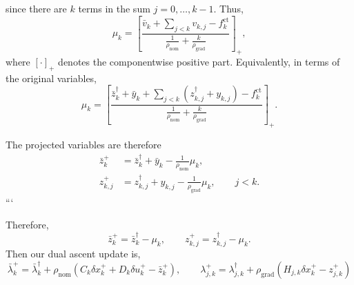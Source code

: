\documentclass{article}
\begin{document}
since there are \(k\) terms in the sum \(j=0,\ldots,k-1\). Thus,
\begin{equation}
    \mu_k
    =
    \left[
        \frac{
            \bar v_k
            +
            \displaystyle\sum_{j<k}v_{k,j}
            -
            f_k^{\mathrm{ct}}
        }{
            \displaystyle
            \frac{1}{\rho_{\mathrm{nom}}}
            +
            \frac{k}{\rho_{\mathrm{grad}}}
        }
    \right]_+,
\end{equation}
where \([\cdot]_+\) denotes the componentwise positive part. Equivalently, in terms of the original variables,
\begin{equation}
    \mu_k
    =
    \left[
        \frac{
            \bar z_k^\dagger
            +
            \bar y_k
            +
            \displaystyle\sum_{j<k}
            \left(
                z_{k,j}^\dagger+y_{k,j}
            \right)
            -
            f_k^{\mathrm{ct}}
        }{
            \displaystyle
            \frac{1}{\rho_{\mathrm{nom}}}
            +
            \frac{k}{\rho_{\mathrm{grad}}}
        }
    \right]_+.
\end{equation}

The projected variables are therefore
\begin{equation}
    \boxed{
    \begin{aligned}
        \bar z_k^+
        &=
        \bar z_k^\dagger
        +
        \bar y_k
        -
        \frac{1}{\rho_{\mathrm{nom}}}\mu_k,
        \\
        z_{k,j}^+
        &=
        z_{k,j}^\dagger
        +
        y_{k,j}
        -
        \frac{1}{\rho_{\mathrm{grad}}}\mu_k,
        \qquad j<k.
    \end{aligned}
    }
\end{equation}
```

Therefore,
\begin{equation}
    \bar z_k^+ = \bar z_k^\dagger - \mu_k, \qquad z_{k,j}^+ = z_{k,j}^\dagger - \mu_k.
\end{equation}
Then our dual ascent update is,
\begin{equation}
    \bar \lambda^+_k = \bar \lambda^\dagger_k + \rho_{\text{nom}}(C_k \delta x_k^+ + D_k \delta u_k^+ - \bar z^+_k),
    \qquad
    \lambda^+_{j,k} = \lambda^\dagger_{j,k} + \rho_{\text{grad}}\left(H_{j,k} \delta x_k^+ - z_{j,k}^+ \right)
\end{equation}
\end{document}
